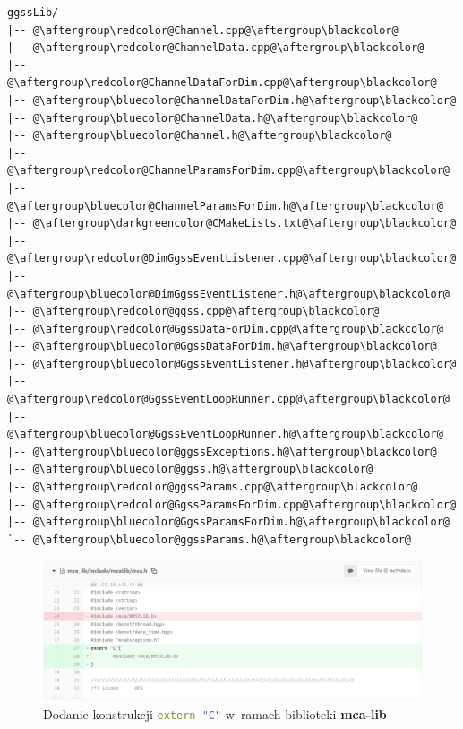\begin{lstlisting}[caption={Pierwotna struktura biblioteki \textbf{ggss-lib}}, label={lst:oldLibStructure}, escapechar=@]
ggssLib/
|-- @\aftergroup\redcolor@Channel.cpp@\aftergroup\blackcolor@
|-- @\aftergroup\redcolor@ChannelData.cpp@\aftergroup\blackcolor@
|-- @\aftergroup\redcolor@ChannelDataForDim.cpp@\aftergroup\blackcolor@
|-- @\aftergroup\bluecolor@ChannelDataForDim.h@\aftergroup\blackcolor@
|-- @\aftergroup\bluecolor@ChannelData.h@\aftergroup\blackcolor@
|-- @\aftergroup\bluecolor@Channel.h@\aftergroup\blackcolor@
|-- @\aftergroup\redcolor@ChannelParamsForDim.cpp@\aftergroup\blackcolor@
|-- @\aftergroup\bluecolor@ChannelParamsForDim.h@\aftergroup\blackcolor@
|-- @\aftergroup\darkgreencolor@CMakeLists.txt@\aftergroup\blackcolor@
|-- @\aftergroup\redcolor@DimGgssEventListener.cpp@\aftergroup\blackcolor@
|-- @\aftergroup\bluecolor@DimGgssEventListener.h@\aftergroup\blackcolor@
|-- @\aftergroup\redcolor@ggss.cpp@\aftergroup\blackcolor@
|-- @\aftergroup\redcolor@GgssDataForDim.cpp@\aftergroup\blackcolor@
|-- @\aftergroup\bluecolor@GgssDataForDim.h@\aftergroup\blackcolor@
|-- @\aftergroup\bluecolor@GgssEventListener.h@\aftergroup\blackcolor@
|-- @\aftergroup\redcolor@GgssEventLoopRunner.cpp@\aftergroup\blackcolor@
|-- @\aftergroup\bluecolor@GgssEventLoopRunner.h@\aftergroup\blackcolor@
|-- @\aftergroup\bluecolor@ggssExceptions.h@\aftergroup\blackcolor@
|-- @\aftergroup\bluecolor@ggss.h@\aftergroup\blackcolor@
|-- @\aftergroup\redcolor@ggssParams.cpp@\aftergroup\blackcolor@
|-- @\aftergroup\redcolor@GgssParamsForDim.cpp@\aftergroup\blackcolor@
|-- @\aftergroup\bluecolor@GgssParamsForDim.h@\aftergroup\blackcolor@
`-- @\aftergroup\bluecolor@ggssParams.h@\aftergroup\blackcolor@
\end{lstlisting}
\onecolumn
\newpage

\begin{figure}
\includegraphics[width=\textwidth]{res/png/addExternC}
\caption{Dodanie konstrukcji \lstinline[language=c++]{extern "C"} w~ramach biblioteki \textbf{mca-lib}}
\label{fig:addExternC}
\end{figure}

